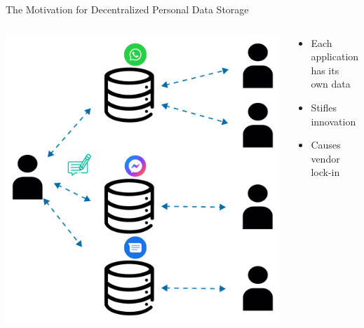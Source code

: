 \begin{frame}{The Motivation for Decentralized Personal Data Storage}
    \begin{columns}
        \begin{column}{0.6\textwidth}
            \includegraphics[width=.85\linewidth]{images/current-bad-message-situation.pdf}
        \end{column}

        \begin{column}{0.4\textwidth}
            \begin{itemize}\setlength\itemsep{1em} %
                \item Each application has its own data
                \item Stifles innovation
                \item Causes vendor lock-in
            \end{itemize}
        \end{column}
    \end{columns}
\end{frame}

